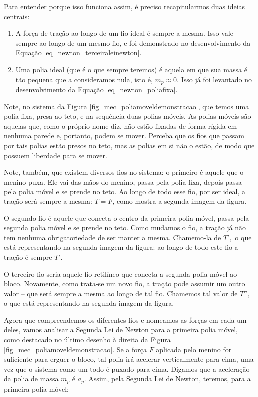 Para entender porque isso funciona assim, é preciso recapitularmos duas ideias centrais:

\begin{enumerate}
    \item [(i)] A força de tração ao longo de um fio ideal é sempre a mesma. Isso vale sempre ao longo de um mesmo fio, e foi demonstrado no desenvolvimento da Equação \eqref{eq_newton_terceiraleinewton}.

    \item [(ii)] Uma polia ideal (que é o que sempre teremos) é aquela em que sua massa é tão pequena que a consideramos nula, isto é, $m_p \approx 0.$ Isso já foi levantado no desenvolvimento da Equação \eqref{eq_newton_poliafixa}.
\end{enumerate}

Note, no sistema da Figura \ref{fig_mec_poliamoveldemonstracao}, que temos uma polia fixa, presa ao teto, e na sequência duas polias móveis. As polias móveis são aquelas que, como o próprio nome diz, não estão fixadas de forma rígida em nenhuma parede e, portanto, podem se mover. Perceba que os fios que passam por tais polias estão presos no teto, mas as polias em si não o estão, de modo que possuem liberdade para se mover.

Note, também, que existem diversos fios no sistema: o primeiro é aquele que o menino puxa. Ele vai das mãos do menino, passa pela polia fixa, depois passa pela polia móvel e se prende no teto. Ao longo de todo esse fio, por ser ideal, a tração será sempre a mesma: $T=F$, como mostra a segunda imagem da figura.

O segundo fio é aquele que conecta o centro da primeira polia móvel, passa pela segunda polia móvel e se prende no teto. Como mudamos o fio, a tração já não tem nenhuma obrigatoriedade de ser manter a mesma. Chamemo-la de $T',$ o que está representando na segunda imagem da figura: ao longo de todo este fio a tração é sempre $T'.$

O terceiro fio seria aquele fio retilíneo que conecta a segunda polia móvel ao bloco. Novamente, como trata-se um novo fio, a tração pode assumir um outro valor -- que será sempre a mesma ao longo de tal fio. Chamemos tal valor de $T'',$ o que está representando na segunda imagem da figura.

Agora que compreendemos os diferentes fios e nomeamos as forças em cada um deles, vamos analisar a Segunda Lei de Newton para a primeira polia móvel, como destacado no último desenho à direita da Figura \ref{fig_mec_poliamoveldemonstracao}. Se a força $F$ aplicada pelo menino for suficiente para erguer o bloco, tal polia irá acelerar verticalmente para cima, uma vez que o sistema como um todo é puxado para cima. Digamos que a aceleração da polia de massa $m_p$ é $a_p.$ Assim, pela Segunda Lei de Newton, teremos, para a primeira polia móvel:

